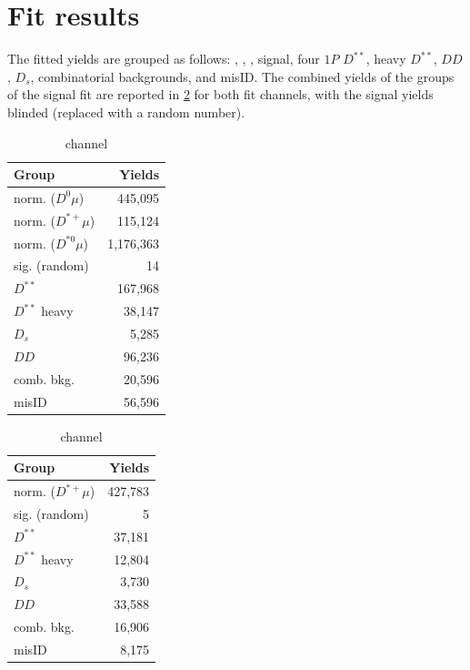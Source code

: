 \section{Fit results}
\label{ref:fit:results}

The fitted yields are grouped as follows:
\Dz\muon, \Dstarp\muon, \Dstarz\muon,
signal,
four $1P$ $D^{**}$,
heavy $D^{**}$,
$DD$,
$D_s$,
combinatorial backgrounds,
and \muon misID.
The combined yields of the groups of the signal fit are reported in
\cref{tab:fit-yields} for both fit channels,
with the signal yields blinded (replaced with a random number).

\begin{table}[!ht]
    \centering
    \caption{Fitted yields of the signal fit.}
    \label{tab:fit-yields}

\begin{subtable}[b]{0.5\textwidth}
    \centering

\begin{tabular}[b]{lr}
\hline
 \bfseries Group               &    \bfseries Yields \\
\hline
 norm. ($D^0\mu$)    &   445,095 \\
 norm. ($D^{*+}\mu$) &   115,124 \\
 norm. ($D^{*0}\mu$) & 1,176,363 \\
 sig. (random)       &        14 \\
 $D^{**}$            &   167,968 \\
 $D^{**}$ heavy      &    38,147 \\
 $D_s$               &     5,285 \\
 $DD$                &    96,236 \\
 comb. bkg.          &    20,596 \\
 misID               &    56,596 \\
\hline
\end{tabular}

    \caption{\Dz channel}
\end{subtable}%
\begin{subtable}[b]{0.5\textwidth}
    \centering

\begin{tabular}[b]{lr}
\hline
 \bfseries Group               &   \bfseries Yields \\
\hline
 norm. ($D^{*+}\mu$) &  427,783 \\
 sig. (random)       &        5 \\
 $D^{**}$            &   37,181 \\
 $D^{**}$ heavy      &   12,804 \\
 $D_s$               &    3,730 \\
 $DD$                &   33,588 \\
 comb. bkg.          &   16,906 \\
 misID               &    8,175 \\
\hline
\end{tabular}

    \caption{\Dstar channel}
\end{subtable}

\end{table}


